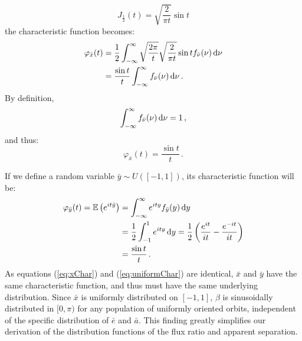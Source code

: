 \begin{equation}
    J_{\frac{1}{2}}(t) = \sqrt{\frac{2}{\pi t}}\sin t
\end{equation}
the characteristic function becomes:
\begin{align}
 \varphi_{\bar{x}}(t)  &= \frac{1}{2} \int_{-\infty}^{\infty} \sqrt{\frac{2 \pi}{t}} \sqrt{\frac{2}{\pi t}}\sin t f_{\bar\nu}(\nu) \,\mathrm{d}\nu \nonumber\\
&= \frac{\sin t}{t} \int_{-\infty}^{\infty} f_{\bar\nu}(\nu) \,\mathrm{d}\nu \,.
\end{align}
By definition,
\begin{equation}
\int_{-\infty}^{\infty} f_{\bar\nu}(\nu) \,\mathrm{d}\nu = 1 \,,
\end{equation}
and thus:
\begin{equation} \label{eq:xChar}
 \varphi_{\bar{x}}(t) = \frac{\sin t}{t} \,.
\end{equation}

If we define a random variable $\bar y \sim U([-1,1])$, its characteristic function will be:
\begin{align}
 \varphi_{\bar{y}}(t) =  \mathbb{E}\left(e^{i t \bar y}\right) &= \int_{-\infty}^{\infty} e^{i t y} f_{\bar y}(y) \,\mathrm{d}y \nonumber \\
&= \frac{1}{2}\int_{-1}^{1} e^{i t y} \,\mathrm{d}y = \frac{1}{2}\left(\frac{e^{i t }}{i t} - \frac{e^{-i t }}{i t}\right) \label{eq:uniformChar} \\ 
&= \frac{\sin t}{t} \nonumber \,.
\end{align}
As equations (\ref{eq:xChar}) and (\ref{eq:uniformChar}) are identical, $\bar{x}$ and $\bar{y}$ have the same characteristic function, and thus must have the same underlying distribution.  Since $\bar x$ is uniformly distributed on $[-1, 1]$, $\beta$ is sinusoidally distributed in $[0,\pi)$ for any population of uniformly oriented orbits, independent of the specific distribution of $\bar e$ and $\bar a$.  This finding greatly simplifies our derivation of the distribution functions of the flux ratio and apparent separation.

